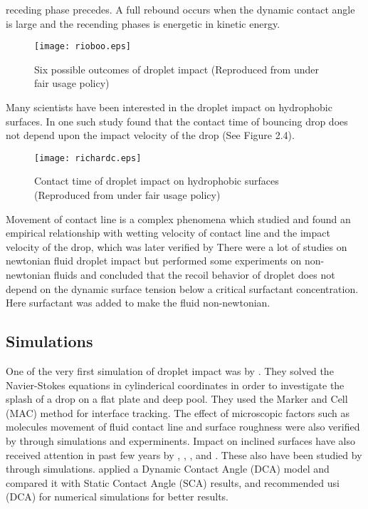 receding phase  precedes. A full rebound occurs when the dynamic contact angle is large and the recending phases is energetic in kinetic energy.
\begin{figure}[tbp]
\centering
 \texttt{[image: rioboo.eps]}
 \caption[Possible outcomes of droplet impact]{Six possible outcomes of droplet impact (Reproduced from \cite{Rioboo2001} under fair usage policy)}
\end{figure}
Many scientists have been interested in the droplet impact on hydrophobic surfaces. In one such study \cite{Richard2002} found that the contact time of 
bouncing drop does not depend upon the impact velocity of the drop (See Figure 2.4).
\begin{figure}[tbp]
\centering
 \texttt{[image: richardc.eps]}
 \caption[Contact time of droplet impact on hydrophobic surfaces ]{Contact time of droplet impact on hydrophobic surfaces (Reproduced from \cite{Richard2002}
 under fair usage policy)}
\end{figure}
Movement of contact line is a complex phenomena which \cite{Roux2004} studied and found an empirical relationship with wetting velocity
of contact line and the impact velocity of the drop, which was later verified by \cite{Hung2011}
There were a lot of studies on newtonian fluid droplet impact but \cite{Crooks2001} performed some experiments on non-newtonian 
fluids and concluded that the recoil behavior of droplet does not depend on the dynamic surface tension below a critical surfactant
concentration. Here surfactant was added to make the fluid non-newtonian.
\subsection{Simulations}
One of the very first simulation of droplet impact was by \cite{Harlow1967}. They solved the Navier-Stokes equations in cylinderical coordinates in order to
investigate the splash of a drop on a flat plate and deep pool. They used the Marker and Cell {(MAC)} method for interface tracking. The effect of microscopic 
factors such as molecules movement of fluid contact line and surface roughness were also verified by \cite{Gunjal2005} through simulations and experminents. Impact on
inclined surfaces have also received attention in past few years by \cite{Pasandideh1996}, \cite{Kang2000}, \cite{Fukai2000}, \cite{Bussmann1999} and \cite{Sikalo2005}.
These also have been studied by \cite{Lunkad2007} through simulations. \cite{Lunkad2007} applied a Dynamic Contact Angle {(DCA)} model and compared it with Static Contact 
Angle {(SCA)} results, and recommended usi {(DCA)} for numerical simulations for better results.

